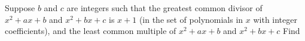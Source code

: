 Suppose  $b$ and $c$ are integers such that the greatest common divisor of $x^2+ax+b$ and $x^2+bx+c$ is $x+1$ (in the set of polynomials in $x$ with integer coefficients), and the least common multiple of $x^2+ax+b$ and $x^2+bx+c$   Find 